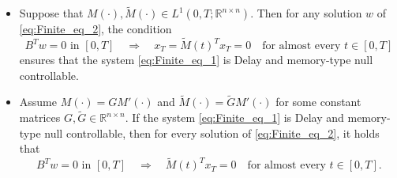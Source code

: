 \documentclass[10pt,a4paper]{amsart}
\begin{document}
\begin{theorem}\label{th:Finite_the_1}
    \begin{itemize}
    \item[(i)] Suppose that \( M(\cdot), \widetilde{M}(\cdot) \in L^1(0,T;\mathbb{R}^{n \times n}) \). Then for any solution \( w \) of \eqref{eq:Finite_eq_2}, the condition
    \begin{equation}\label{eq:Finite_eq_3}
         B^T w = 0 \text{ in } [0,T] \quad \Rightarrow \quad x_T = \widetilde{M}(t)^T x_T = 0 \quad \text{for almost every } t \in [0,T]
    \end{equation}
    ensures that the system \eqref{eq:Finite_eq_1} is Delay and memory-type null controllable.

    \item[(ii)] Assume \( M(\cdot) = G M'(\cdot) \) and \( \widetilde{M}(\cdot) = \widetilde{G} M'(\cdot) \) for some constant matrices \( G, \widetilde{G} \in \mathbb{R}^{n \times n} \). If the system \eqref{eq:Finite_eq_1} is Delay and memory-type null controllable, then for every solution of \eqref{eq:Finite_eq_2}, it holds that
     \begin{equation}\label{eq:Finite_eq_4}
         B^T w = 0 \text{ in } [0,T] \quad \Rightarrow \quad \widetilde{M}(t)^T x_T = 0 \quad \text{for almost every } t \in [0,T].
    \end{equation}
    \end{itemize}
\end{theorem}
\end{document}
